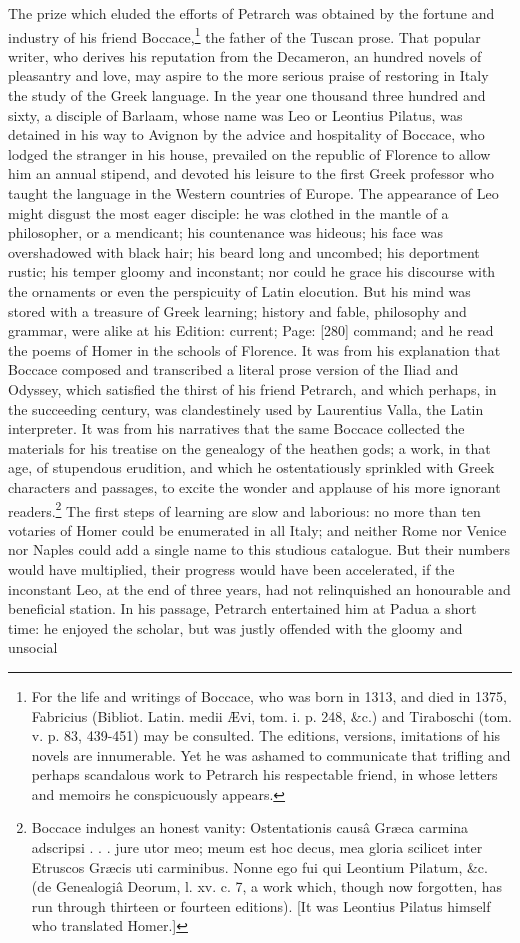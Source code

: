 The prize which eluded the efforts of Petrarch was obtained by the fortune and industry of his friend Boccace,\footnote{For the life and writings of Boccace, who was born in 1313, and died in 1375, Fabricius (Bibliot. Latin. medii Ævi, tom. i. p. 248, \&c.) and Tiraboschi (tom. v. p. 83, 439-451) may be consulted. The editions, versions, imitations of his novels are innumerable. Yet he was ashamed to communicate that trifling and perhaps scandalous work to Petrarch his respectable friend, in whose letters and memoirs he conspicuously appears.} the father of the Tuscan prose. That popular writer, who derives his reputation from the Decameron, an hundred novels of pleasantry and love, may aspire to the more serious praise of restoring in Italy the study of the Greek language. In the year one thousand three hundred and sixty, a disciple of Barlaam, whose name was Leo or Leontius Pilatus, was detained in his way to Avignon by the advice and hospitality of Boccace, who lodged the stranger in his house, prevailed on the republic of Florence to allow him an annual stipend, and devoted his leisure to the first Greek professor who taught the language in the Western countries of Europe. The appearance of Leo might disgust the most eager disciple: he was clothed in the mantle of a philosopher, or a mendicant; his countenance was hideous; his face was overshadowed with black hair; his beard long and uncombed; his deportment rustic; his temper gloomy and inconstant; nor could he grace his discourse with the ornaments or even the perspicuity of Latin elocution. But his mind was stored with a treasure of Greek learning; history and fable, philosophy and grammar, were alike at his Edition: current; Page: [280] command; and he read the poems of Homer in the schools of Florence. It was from his explanation that Boccace composed and transcribed a literal prose version of the Iliad and Odyssey, which satisfied the thirst of his friend Petrarch, and which perhaps, in the succeeding century, was clandestinely used by Laurentius Valla, the Latin interpreter. It was from his narratives that the same Boccace collected the materials for his treatise on the genealogy of the heathen gods; a work, in that age, of stupendous erudition, and which he ostentatiously sprinkled with Greek characters and passages, to excite the wonder and applause of his more ignorant readers.\footnote{Boccace indulges an honest vanity: Ostentationis causâ Græca carmina adscripsi . . . jure utor meo; meum est hoc decus, mea gloria scilicet inter Etruscos Græcis uti carminibus. Nonne ego fui qui Leontium Pilatum, \&c. (de Genealogiâ Deorum, l. xv. c. 7, a work which, though now forgotten, has run through thirteen or fourteen editions). [It was Leontius Pilatus himself who translated Homer.]} The first steps of learning are slow and laborious: no more than ten votaries of Homer could be enumerated in all Italy; and neither Rome nor Venice nor Naples could add a single name to this studious catalogue. But their numbers would have multiplied, their progress would have been accelerated, if the inconstant Leo, at the end of three years, had not relinquished an honourable and beneficial station. In his passage, Petrarch entertained him at Padua a short time: he enjoyed the scholar, but was justly offended with the gloomy and unsocial 
